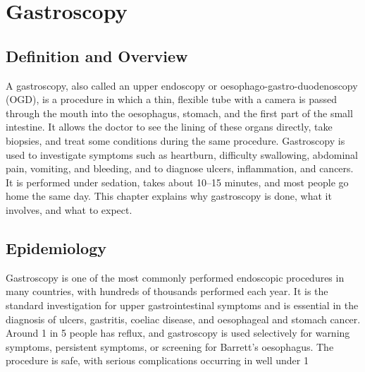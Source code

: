 \chapter{Gastroscopy}

\section*{Definition and Overview}
A gastroscopy, also called an upper endoscopy or oesophago-gastro-duodenoscopy (OGD), is a procedure in which a thin, flexible tube with a camera is passed through the mouth into the oesophagus, stomach, and the first part of the small intestine. It allows the doctor to see the lining of these organs directly, take biopsies, and treat some conditions during the same procedure. Gastroscopy is used to investigate symptoms such as heartburn, difficulty swallowing, abdominal pain, vomiting, and bleeding, and to diagnose ulcers, inflammation, and cancers. It is performed under sedation, takes about 10--15 minutes, and most people go home the same day. This chapter explains why gastroscopy is done, what it involves, and what to expect.

\section*{Epidemiology}
Gastroscopy is one of the most commonly performed endoscopic procedures in many countries, with hundreds of thousands performed each year. It is the standard investigation for upper gastrointestinal symptoms and is essential in the diagnosis of ulcers, gastritis, coeliac disease, and oesophageal and stomach cancer. Around 1 in 5 people has reflux, and gastroscopy is used selectively for warning symptoms, persistent symptoms, or screening for Barrett's oesophagus. The procedure is safe, with serious complications occurring in well under 1%

